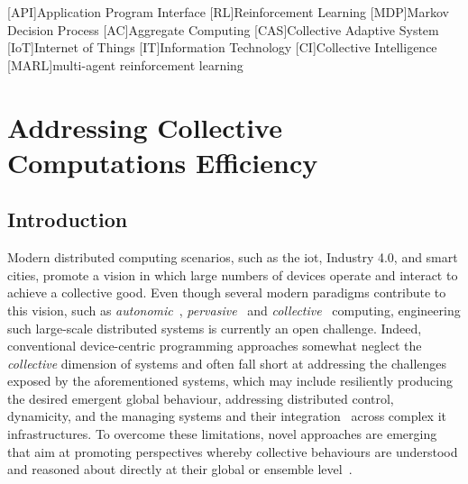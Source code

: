 
\newcommand{\export}{export}
\newcommand{\round}{round}
\newcommand{\RS}{\mathcal{S}}
\newcommand{\RA}{\mathcal{A}}
\newcommand{\RP}{\mathcal{P}}
\newcommand{\RR}{\mathcal{R}}
\newcommand{\RE}{\mathbb{E}}
\newcommand{\decision}[1]{{\color{red} #1}}
\newcommand{\mtext}[1]{\text{\texttt{#1}}}
\newcommand{\revision}[1]{{#1}}
\newenvironment{iequation}{\(}{\). }
\def\tablename{Table}
\sloppypar
[API]{Application Program Interface}
[RL]{Reinforcement Learning}
[MDP]{Markov Decision Process}
[AC]{Aggregate Computing}
[CAS]{Collective Adaptive System}
[IoT]{Internet of Things}
[IT]{Information Technology}
[CI]{Collective Intelligence}
[MARL]{multi-agent reinforcement learning}
\newcommand{\scafiinline}[1]{\lstinline[language=scafi]$#1$}


\chapter{Addressing Collective Computations Efficiency}


\section{Introduction}

\lstset{language=scafi}

Modern distributed computing scenarios, such as the \ac{iot}, Industry 4.0, and smart cities, promote a vision in which large numbers of devices operate and interact to achieve a collective good.
%
Even though several modern paradigms contribute to this vision, such as \emph{autonomic}~\cite{DBLP:journals/computer/KephartC03}, \emph{pervasive}~\cite{DBLP:journals/wc/Satyanarayanan01} and \emph{collective}~\cite{DBLP:journals/computer/Abowd16} computing, engineering such large-scale distributed systems is currently an open challenge. 
%
Indeed, conventional device-centric programming approaches somewhat neglect the \emph{collective} dimension of systems and often fall short at addressing the challenges exposed by the aforementioned systems, which may include resiliently producing the desired emergent global behaviour, 
addressing distributed control, dynamicity, and the managing systems and their integration~\cite{DBLP:journals/fgcs/BellmanBDEGLLNP21} across complex \ac{it} infrastructures.
%
To overcome these limitations, novel approaches are emerging that aim at promoting perspectives whereby collective behaviours are understood and reasoned about directly at their global or ensemble level~\cite{DBLP:journals/sttt/NicolaJW20,DBLP:conf/birthday/BucchiaroneM19,DBLP:journals/sttt/BuresGHPKVK20,DBLP:journals/jlap/ViroliBDACP19}.

